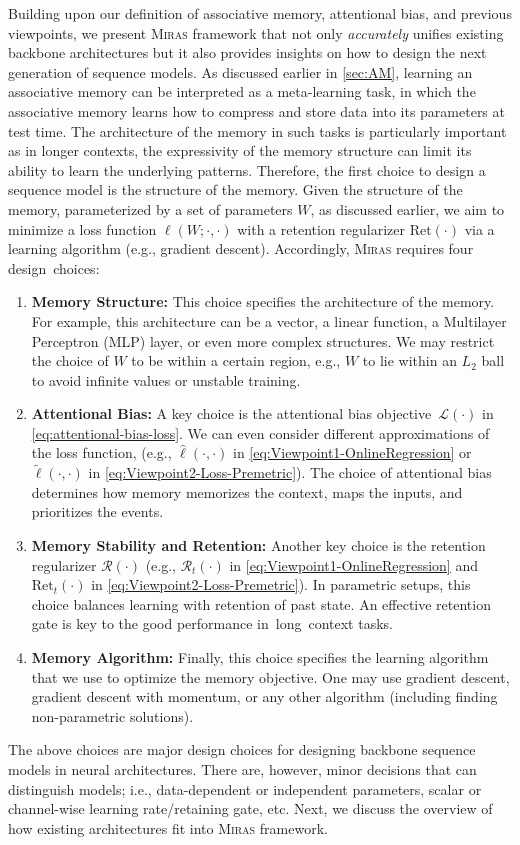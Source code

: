 \documentclass{article}
\newcommand{\framework}[0]{\textsc{Miras}}
\theoremstyle{plain}
\theoremstyle{definition}
\theoremstyle{remark}
\begin{document}
Building upon our definition of associative memory, attentional bias, and previous viewpoints, we present \framework{} framework that not only \emph{accurately} unifies existing backbone architectures but it also provides insights on how to design the next generation of sequence models. As discussed earlier in \autoref{sec:AM}, learning an associative memory can be interpreted as a meta-learning task, in which the associative memory learns how to compress and store data into its parameters at test time. The architecture of the memory in such tasks is particularly important as in longer contexts, the expressivity of the memory structure can limit its ability to learn the underlying patterns. Therefore, the first choice to design a sequence model is the structure of the memory. 
Given the structure of the memory, parameterized by a set of parameters $W$, as discussed earlier, we aim to minimize a loss function $\ell(W; \cdot, \cdot)$ with a retention regularizer $\mbox{Ret}(\cdot)$ via a learning algorithm (e.g., gradient descent). Accordingly, \framework{} requires four design~choices:
\begin{enumerate}[leftmargin=15pt]
    \item \textbf{Memory Structure:} This choice specifies the architecture of the memory. For example, this architecture can be a vector, a linear function, a Multilayer Perceptron (MLP) layer, or even more complex structures. We may restrict the choice of $W$ to be within a certain region, e.g., $W$ to lie within an $L_2$ ball to avoid infinite values or unstable training.
    \item \textbf{Attentional Bias:} A key choice is the attentional bias objective~$\mathcal{L}(\cdot)$ in \autoref{eq:attentional-bias-loss}. We can even consider different approximations of the loss function, (e.g.,  $\widehat{\ell} (\cdot,\cdot)$ in \eqref{eq:Viewpoint1-OnlineRegression} or $\widetilde{\ell}(\cdot,\cdot)$ in \eqref{eq:Viewpoint2-Loss-Premetric}). The choice of attentional bias determines how memory memorizes the context, maps the inputs, and prioritizes the events.
    \item \textbf{Memory Stability and Retention:} Another key choice is the retention regularizer $\mathcal{R}(\cdot)$ (e.g., $\mathcal{R}_t(\cdot)$ in \eqref{eq:Viewpoint1-OnlineRegression} and $\mbox{Ret}_t(\cdot)$ in \eqref{eq:Viewpoint2-Loss-Premetric}). In parametric setups, this choice balances learning with retention of past state. An effective retention gate is key to the good performance in~long~context tasks. 
    \item \textbf{Memory Algorithm:} Finally, this choice specifies the learning algorithm that we use to optimize the memory objective. One may use gradient descent, gradient descent with momentum, or any other algorithm (including finding non-parametric solutions).  
\end{enumerate}
The above choices are major design choices for designing backbone sequence models in neural architectures. There are, however, minor decisions that can distinguish models; i.e., data-dependent or independent parameters, scalar or channel-wise learning rate/retaining gate, etc. Next, we discuss the overview of how existing architectures fit into \framework{} framework. 
\end{document}
